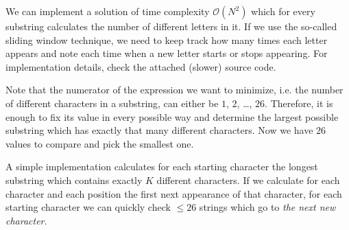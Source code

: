 \documentclass[a4paper]{article}
\begin{document}
We can implement a solution of time complexity $\mathcal{O}(N^2)$ which
for every substring calculates the number of different letters in it. If
we use the so-called sliding window technique, we need to keep track
how many times each letter appears and note each time when a new letter
starts or stops appearing. For implementation details, check the attached
(slower) source code.

Note that the numerator of the expression we want to minimize, i.e. the
number of different characters in a substring, can either be $1$, $2$, \dots,
$26$. Therefore, it is enough to fix its value in every possible way and
determine the largest possible substring which has exactly that many different
characters. Now we have $26$ values to compare and pick the smallest one.

A simple implementation calculates for each starting character the longest
substring which contains exactly $K$ different characters. If we calculate
for each character and each position the first next appearance of that
character, for each starting character we can quickly check $\le 26$ strings
which go to \textit{the next new character}.
\end{document}
